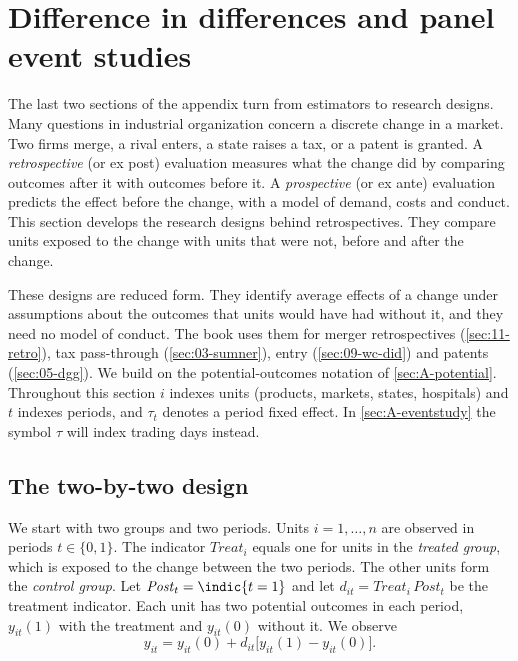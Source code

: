 \section{Difference in differences and panel event studies}\label{sec:A-did}

The last two sections of the appendix turn from estimators to research designs. Many questions in industrial
organization concern a discrete change in a market. Two firms merge, a rival
enters, a state raises a tax, or a patent is granted. A \emph{retrospective} (or ex post) evaluation measures
what the change did by comparing outcomes after it with outcomes before it. A \emph{prospective} (or ex ante)
evaluation predicts the effect before the change, with a model of demand, costs and conduct. This section
develops the research designs behind retrospectives. They compare units exposed to the change with units that
were not, before and after the change.

These designs are reduced form. They identify average effects of a change under assumptions about the outcomes
that units would have had without it, and they need no model of conduct. The book uses them for merger
retrospectives (\cref{sec:11-retro}), tax pass-through (\cref{sec:03-sumner}), entry
(\cref{sec:09-wc-did}) and patents (\cref{sec:05-dgg}). We build on the potential-outcomes notation of
\cref{sec:A-potential}. Throughout this section $i$ indexes units (products, markets, states, hospitals) and
$t$ indexes periods, and $\tau_t$ denotes a period fixed effect. In \cref{sec:A-eventstudy} the symbol $\tau$ will
index trading days instead.

\subsection{The two-by-two design}\label{sec:A-did-2x2}

We start with two groups and two periods. Units $i=1,\dots,n$ are observed in periods $t\in\{0,1\}$. The
indicator $\mathit{Treat}_i$ equals one for units in the \emph{treated group}, which is exposed to the change
between the two periods. The other units form the \emph{control group}. Let $\mathit{Post}_t=\indic\{t=1\}$ and
let $d_{it}=\mathit{Treat}_i\,\mathit{Post}_t$ be the treatment indicator. Each unit has two potential outcomes in
each period, $y_{it}(1)$ with the treatment and $y_{it}(0)$ without it. We observe
\begin{equation*}
y_{it}=y_{it}(0)+d_{it}\big[y_{it}(1)-y_{it}(0)\big].
\end{equation*}


